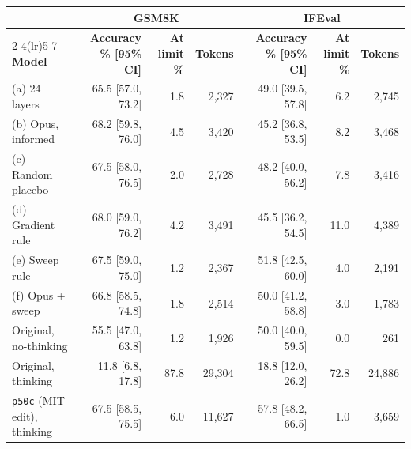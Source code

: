 \begin{tabular}{lrrrrrr}
\toprule
& \multicolumn{3}{c}{\textbf{GSM8K}} & \multicolumn{3}{c}{\textbf{IFEval}} \\
\cmidrule(lr){2-4}\cmidrule(lr){5-7}
\textbf{Model} & \textbf{Accuracy \% [95\% CI]} & \textbf{At limit \%} & \textbf{Tokens} & \textbf{Accuracy \% [95\% CI]} & \textbf{At limit \%} & \textbf{Tokens} \\
\midrule
(a) 24 layers & 65.5 [57.0, 73.2] & 1.8 & 2{,}327 & 49.0 [39.5, 57.8] & 6.2 & 2{,}745 \\
(b) Opus, informed & 68.2 [59.8, 76.0] & 4.5 & 3{,}420 & 45.2 [36.8, 53.5] & 8.2 & 3{,}468 \\
(c) Random placebo & 67.5 [58.0, 76.5] & 2.0 & 2{,}728 & 48.2 [40.0, 56.2] & 7.8 & 3{,}416 \\
(d) Gradient rule & 68.0 [59.0, 76.2] & 4.2 & 3{,}491 & 45.5 [36.2, 54.5] & 11.0 & 4{,}389 \\
(e) Sweep rule & 67.5 [59.0, 75.0] & 1.2 & 2{,}367 & 51.8 [42.5, 60.0] & 4.0 & 2{,}191 \\
(f) Opus + sweep & 66.8 [58.5, 74.8] & 1.8 & 2{,}514 & 50.0 [41.2, 58.8] & 3.0 & 1{,}783 \\
\midrule
Original, no-thinking & 55.5 [47.0, 63.8] & 1.2 & 1{,}926 & 50.0 [40.0, 59.5] & 0.0 & 261 \\
Original, thinking & 11.8 [6.8, 17.8] & 87.8 & 29{,}304 & 18.8 [12.0, 26.2] & 72.8 & 24{,}886 \\
\texttt{p50c} (MIT edit), thinking & 67.5 [58.5, 75.5] & 6.0 & 11{,}627 & 57.8 [48.2, 66.5] & 1.0 & 3{,}659 \\
\bottomrule
\end{tabular}
